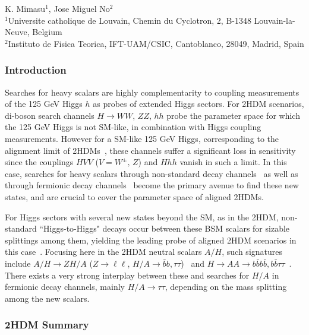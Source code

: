 \documentclass[../report.tex]{subfiles}
\begin{document}
\begin{center}
 {K. Mimasu$^{1}$, Jose Miguel No$^{2}$ \\
}
 {\small $^{1}$Universite catholique de Louvain, Chemin du Cyclotron, 2, B-1348 Louvain-la-Neuve, Belgium \\
 $^{2}$Instituto de Fisica Teorica, IFT-UAM/CSIC, Cantoblanco, 28049, Madrid, Spain}
\end{center}

\subsubsection{Introduction}

Searches for heavy scalars are highly complementarity to coupling measurements of the 125 GeV Higgs $h$ as probes of extended Higgs sectors. For 2HDM scenarios, di-boson search channels $H \to WW$, $ZZ$, $hh$ probe the parameter space for which the 125 GeV Higgs is not SM-like, in combination with Higgs coupling measurements.
However for a SM-like 125 GeV Higgs, corresponding to the alignment limit of 2HDMs~\cite{Gunion:2002zf}, these channels suffer a significant loss in  
sensitivity since the couplings $HVV$ ($V = W^{\pm},\,Z$) and $Hhh$ vanish in such a limit. In this case, searches for heavy scalars through non-standard decay channels~\cite{Coleppa:2014hxa,Dorsch:2014qja,Li:2015lra,Kling:2016opi} 
as well as through fermionic decay channels~\cite{Craig:2015jba,Gori:2016zto} become the primary avenue to find these new states, and are crucial to cover the parameter space of aligned 2HDMs.

For Higgs sectors with several new states beyond the SM, as in the 2HDM, 
non-standard ``Higgs-to-Higgs" decays occur between these BSM scalars for sizable splittings among them, yielding the leading probe of aligned 
2HDM scenarios in this case~\cite{Dorsch:2016tab}. 
Focusing here in the 2HDM neutral scalars $A/H$, such signatures include 
$A/H\to Z H/A$ ($Z \to \ell \ell$, $H/A \to \bar{b}b, \tau\tau$)~\cite{Coleppa:2014hxa,Dorsch:2014qja} and 
$H \to A A \to b\bar{b} b\bar{b}, b\bar{b} \tau\tau$~\cite{Brooijmans:2018xbu}.
There exists a very strong interplay between these and searches for $H/A$ in fermionic decay channels, mainly  
$H/A \to \tau\tau$, depending on the mass splitting among the new scalars.

\subsubsection{2HDM Summary}
\end{document}
